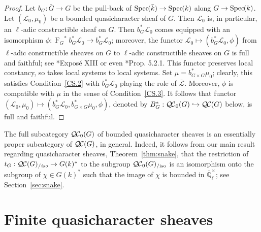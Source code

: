 \documentclass[11pt]{amsart}
\theoremstyle{plain}
\theoremstyle{definition}
\theoremstyle{remark}
\newcommand{\Spec}[1]{{\operatorname{Spec}\hskip-1pt( #1 )}}
\newcommand{\EE}{\mathbb{\bar Q}_\ell}
\newcommand{\bFq}{\bar{k}}
\newcommand{\Fq}{k}
\newcommand{\EEx}{\EE^\times}
\newcommand{\Frob}[1]{{\operatorname{F}_{#1}}}
\newcommand{\cs}[1]{{\mathcal{#1}}}
\newcommand{\gcs}[1]{{\mathcal{\bar #1}}}
\newcommand{\QC}{{\mathcal{Q\hskip-0.8pt C}}}
\newcommand{\QCb}{{\QC_0}}
\newcommand{\QCiso}[1]{\QC(#1)_{/\textit{iso}}}
\newcommand{\QCbiso}[1]{\QCb(#1)_{/\text{iso}}}
\newcommand{\trFrob}[1]{t_{#1}}
\begin{document}
\begin{proof}
 Let $b_G : {\bar G} \to G$ be the pull-back of $\Spec{\bFq} \to \Spec{\Fq}$ along $G\to \Spec{\Fq}$.
 Let $(\cs{L}_0,\mu_0)$ be a bounded quasicharacter sheaf of $G$. 
 Then $\cs{L}_0$ is, in particular, an $\ell$-adic constructible sheaf on $G$. 
 Then $b_G^* \cs{L}_0$ comes equipped with an isomorphism 
 $\phi : \Frob{G}^* b_G^*\cs{L}_0 \to b_G^* \cs{L}_0$; 
 moreover, the functor $\cs{L}_0 \mapsto (b_G^* \cs{L}_0,\phi)$  
 from $\ell$-adic constructible sheaves on $G$ to $\ell$-adic constructible sheaves on $G$
 is full and faithful; see \cite{SGA7.2}*{Expos\'e XIII} or even \cite{BBD}*{Prop. 5.2.1}. 
 This functor preserves local constancy, so takes local systems to local systems. 
 Set $\mu = b_{G\times G}^*\mu_0$; clearly, this satisfies Condition~\ref{CS.2} 
 with $b_G^*\cs{L}_0$ playing the role of $\gcs{L}$.
 Moreover, $\phi$ is compatible with $\mu$ in the sense of Condition~\ref{CS.3}.
 It follows that functor $(\cs{L}_0,\mu_0) \mapsto (b_G^*\cs{L}_0,b_{G\times G}^* \mu_0, \phi)$, denoted by  $B_G^*: \QCb(G) \hookrightarrow \QC(G)$ below, is full and faithful.
\end{proof}

The full subcategory $\QCb(G)$ of bounded quasicharacter sheaves is an essentially proper subcategory of $\QC(G)$, in general. Indeed, it follows from our main result regarding quasicharacter sheaves, Theorem~\ref{thm:snake}, that the restriction of $\trFrob{G} : \QCiso{G} \to G(\Fq)^*$ to the subgroup $\QCbiso{G}$ is an isomorphism onto the subgroup of $\chi \in G(\Fq)^*$ such that the image of $\chi$ is bounded in $\EEx$; see Section~\ref{sec:snake}.

\section{Finite quasicharacter sheaves}\label{sec:finite}

 
\end{document}
